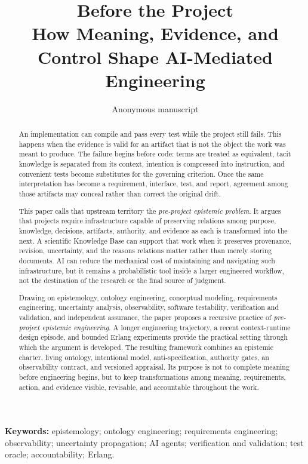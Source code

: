 \documentclass[10pt,a4paper]{article}
\title{\textbf{Before the Project}\\[0.5em]
\large How Meaning, Evidence, and Control Shape AI-Mediated Engineering}
\author{Anonymous manuscript}
\date{}
\begin{document}
\maketitle

\begin{abstract}
An implementation can compile and pass every test while the project still fails. This happens when the evidence is valid for an artifact that is not the object the work was meant to produce. The failure begins before code: terms are treated as equivalent, tacit knowledge is separated from its context, intention is compressed into instruction, and convenient tests become substitutes for the governing criterion. Once the same interpretation has become a requirement, interface, test, and report, agreement among those artifacts may conceal rather than correct the original drift.

This paper calls that upstream territory the \emph{pre-project epistemic problem}. It argues that projects require infrastructure capable of preserving relations among purpose, knowledge, decisions, artifacts, authority, and evidence as each is transformed into the next. A scientific Knowledge Base can support that work when it preserves provenance, revision, uncertainty, and the reasons relations matter rather than merely storing documents. AI can reduce the mechanical cost of maintaining and navigating such infrastructure, but it remains a probabilistic tool inside a larger engineered workflow, not the destination of the research or the final source of judgment.

Drawing on epistemology, ontology engineering, conceptual modeling, requirements engineering, uncertainty analysis, observability, software testability, verification and validation, and independent assurance, the paper proposes a recursive practice of \emph{pre-project epistemic engineering}. A longer engineering trajectory, a recent context-runtime design episode, and bounded Erlang experiments provide the practical setting through which the argument is developed. The resulting framework combines an epistemic charter, living ontology, intentional model, anti-specification, authority gates, an observability contract, and versioned appraisal. Its purpose is not to complete meaning before engineering begins, but to keep transformations among meaning, requirements, action, and evidence visible, revisable, and accountable throughout the work.
\end{abstract}

\noindent\textbf{Keywords:} epistemology; ontology engineering; requirements engineering; observability; uncertainty propagation; AI agents; verification and validation; test oracle; accountability; Erlang.
\end{document}
